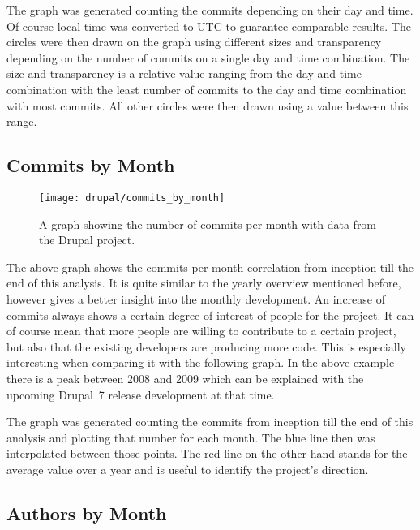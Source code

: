 The graph was generated counting the commits depending on their day and time.
Of course local time was converted to \ac{UTC} to guarantee comparable results.
The circles were then drawn on the graph using different sizes and transparency
depending on the number of commits on a single day and time combination. The
size and transparency is a relative value ranging from the day and time
combination with the least number of commits to the day and time combination
with most commits. All other circles were then drawn using a value between this
range.


\subsection{Commits by Month} %

\begin{figure}[h!t]
  \centering
  \texttt{[image: drupal/commits\_by\_month]}
  \caption[The Commits by Month Graph]
  {A graph showing the number of commits per month with data from the Drupal
    project.}
\end{figure}

The above graph shows the commits per month correlation from inception till the
end of this analysis. It is quite similar to the yearly overview mentioned
before, however gives a better insight into the monthly development. An
increase of commits always shows a certain degree of interest of people for the
project. It can of course mean that more people are willing to contribute to a
certain project, but also that the existing developers are producing more code.
This is especially interesting when comparing it with the following graph. In
the above example there is a peak between 2008 and 2009 which can be explained
with the upcoming Drupal~7 release development at that time.

The graph was generated counting the commits from inception till the end of
this analysis and plotting that number for each month. The blue line then was
interpolated between those points. The red line on the other hand stands for
the average value over a year and is useful to identify the project's
direction.


\subsection{Authors by Month} %

